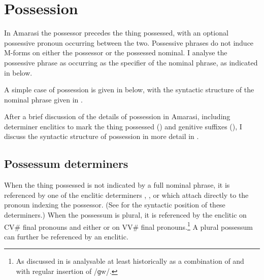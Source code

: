 \section{Possession}\label{sec:Poss}
In Amarasi the possessor precedes the thing possessed,
with an optional possessive pronoun occurring between the two.
Possessive phrases do not induce M-forms on either the possessor or the possessed nominal.
I analyse the possessive phrase as occurring as the specifier of the nominal phrase,
as indicated in  below.

\begin{exe}
	\label{tr:PossP2}
\end{exe}

A simple case of possession is given in  below,
with the syntactic structure of the nominal phrase given in .

\begin{exe}
	\label{ex:130921-1, 0.50}
	\label{tr:130921-1, 0.50}
\end{exe}

After a brief discussion of the details of possession in Amarasi, including
determiner enclitics to mark the thing possessed ()
and genitive suffixes (), I discuss the syntactic structure
of possession in more detail in .

\subsection{Possessum determiners}\label{sec:PosDet}
When the thing possessed is not indicated by a full nominal phrase,
it is referenced by one of the enclitic determiners
, ,  or  which
attach directly to the pronoun indexing the possessor.
(See  for the syntactic position of these determiners.)
When the possessum is plural, it is referenced by the enclitic
 on CV{\#} final pronouns and either  or  on VV{\#} final pronouns.\footnote{
		As discussed in   is analysable at least historically
		as a combination of  and  with regular insertion of /ɡw/.}
A plural possessum can further be referenced by an enclitic.

